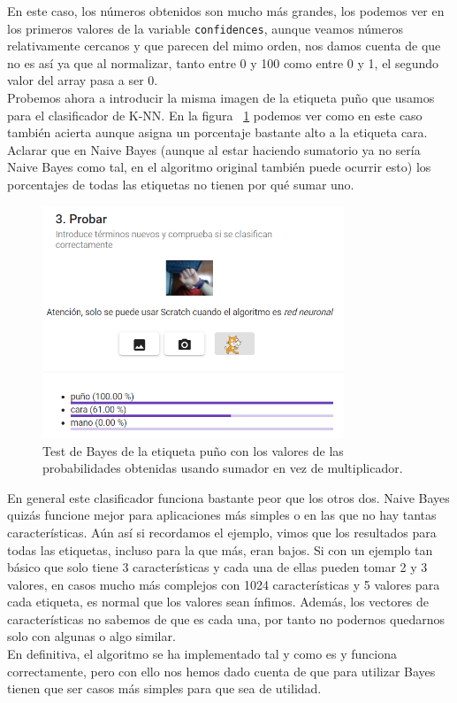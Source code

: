\documentclass[a4paper, 12pt]{book}
\begin{document}
En este caso, los números obtenidos son mucho más grandes, los podemos ver en los primeros valores de la variable \texttt{confidences}, aunque veamos números relativamente cercanos y que parecen del mimo orden, nos damos cuenta de que no es así ya que al normalizar, tanto entre 0 y 100 como entre 0 y 1, el segundo valor del array pasa a ser 0.\\
Probemos ahora a introducir la misma imagen de la etiqueta puño que usamos para el clasificador de K-NN. En la figura ~\ref{fig:bayestestpuno} podemos ver como en este caso también acierta aunque asigna un porcentaje bastante alto a la etiqueta cara. Aclarar que en Naive Bayes (aunque al estar haciendo sumatorio ya no sería Naive Bayes como tal, en el algoritmo original también puede ocurrir esto) los porcentajes de todas las etiquetas no tienen por qué sumar uno.

\begin{figure}
	\centering
	\includegraphics[width=9cm, keepaspectratio]{img/bayestestpuno}
	\caption{Test de Bayes de la etiqueta puño con los valores de las probabilidades obtenidas usando sumador en vez de multiplicador.}			
	\label{fig:bayestestpuno}
\end{figure}

En general este clasificador funciona bastante peor que los otros dos. Naive Bayes quizás funcione mejor para aplicaciones más simples o en las que no hay tantas características. Aún así si recordamos el ejemplo, vimos que los resultados para todas las etiquetas, incluso para la que más, eran bajos. Si con un ejemplo tan básico que solo tiene 3 características y cada una de ellas pueden tomar 2 y 3 valores, en casos mucho más complejos con 1024 características y 5 valores para cada etiqueta, es normal que los valores sean ínfimos. Además, los vectores de características no sabemos de que es cada una, por tanto no podernos quedarnos solo con algunas o algo similar.\\
En definitiva, el algoritmo se ha implementado tal y como es y funciona correctamente, pero con ello nos hemos dado cuenta de que para utilizar Bayes tienen que ser casos más simples para que sea de utilidad.
\end{document}
